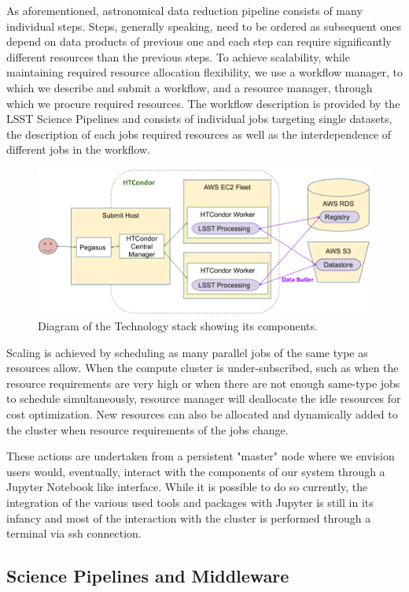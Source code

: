 \documentclass[a4paper, 10pt, conference]{ieeeconf}
\begin{document}
As aforementioned, astronomical data reduction pipeline consists of many individual steps. Steps, generally speaking, need to be ordered as subsequent ones depend on data products of previous one and each step can require significantly different resources than the previous steps. To achieve scalability, while maintaining required resource allocation flexibility, we use a workflow manager, to which we describe and submit a workflow, and a resource manager, through which we procure required resources. The workflow description is provided by the LSST Science Pipelines and consists of individual jobs targeting single datasets, the description of each jobs required resources as well as the interdependence of different jobs in the workflow. 
\begin{figure}[htb]
\centering
\includegraphics[width=\columnwidth]{figures/workflow.png}
\caption{Diagram of the Technology stack showing its components.}
\label{fig:techstack}
\end{figure}
Scaling is achieved by scheduling as many parallel jobs of the same type as resources allow. When the compute cluster is under-subscribed, such as when the resource requirements are very high or when there are not enough same-type jobs to schedule simultaneously, resource manager will deallocate the idle resources for cost optimization. New resources can also be allocated and dynamically added to the cluster when resource requirements of the jobs change. 

These actions are undertaken from a persistent "master" node where we envision users would, eventually, interact with the components of our system through a Jupyter Notebook like interface. While it is possible to do so currently, the integration of the various used tools and packages with Jupyter is still in its infancy and most of the interaction with the cluster is performed through a terminal via ssh connection.



\subsection{Science Pipelines and Middleware}
\label{subsec:scipipe}
\end{document}

